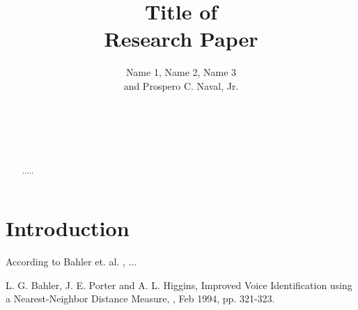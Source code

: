 \documentclass{acm_proc_article-sp}
\begin{document}
\title{Title of \\Research Paper}

\author{
\alignauthor Name 1, Name 2, Name 3\\ and Prospero C. Naval, Jr.\\
       \\
       \\
       \\
       \\
}
\maketitle

\begin{abstract}
.....
\end{abstract}

\section{Introduction}
According to Bahler et. al. \cite{bahl}, ...



\nocite{*}

\begin{thebibliography}{1}


L. G. Bahler, J. E. Porter and A. L. Higgins,
\newblock Improved Voice Identification using a Nearest-Neighbor Distance Measure,
, Feb 1994, pp. 321-323.

\end{thebibliography}
\end{document}
